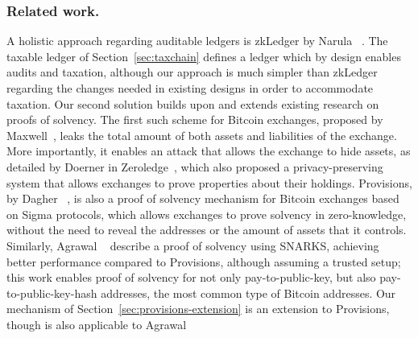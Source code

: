 \subsubsection{Related work.}\label{sec:related}

A holistic approach regarding auditable ledgers is zkLedger by Narula
\etal~\cite{EPRINT:NarVasVir18}. The taxable ledger of
Section~\ref{sec:taxchain} defines a ledger which by design enables audits and
taxation, although our approach is much simpler than zkLedger regarding the
changes needed in existing designs in order to accommodate taxation. Our second
solution builds upon and extends existing research on proofs of solvency. The
first such scheme for Bitcoin exchanges, proposed by
Maxwell~\cite{wilcox2014proving}, leaks the total amount of both assets and
liabilities of the exchange. More importantly, it enables an attack that allows
the exchange to hide assets, as detailed by Doerner \etal in
Zeroledge~\cite{doernerzeroledge}, which also proposed a privacy-preserving
system that allows exchanges to prove properties about their holdings.
Provisions, by Dagher \etal~\cite{CCS:DBBCB15}, is also a proof of solvency
mechanism for Bitcoin exchanges based on Sigma protocols, which allows
exchanges to prove solvency in zero-knowledge, \ie without the need to reveal
the addresses or the amount of assets that it controls. Similarly, Agrawal
\etal~\cite{C:AgrGanMoh18} describe a proof of solvency using SNARKS, achieving
better performance compared to Provisions, although assuming a trusted setup;
this work enables proof of solvency for not only pay-to-public-key, but also
pay-to-public-key-hash addresses, the most common type of Bitcoin addresses.
Our mechanism of Section~\ref{sec:provisions-extension} is an extension to
Provisions, though is also applicable to Agrawal \etal

